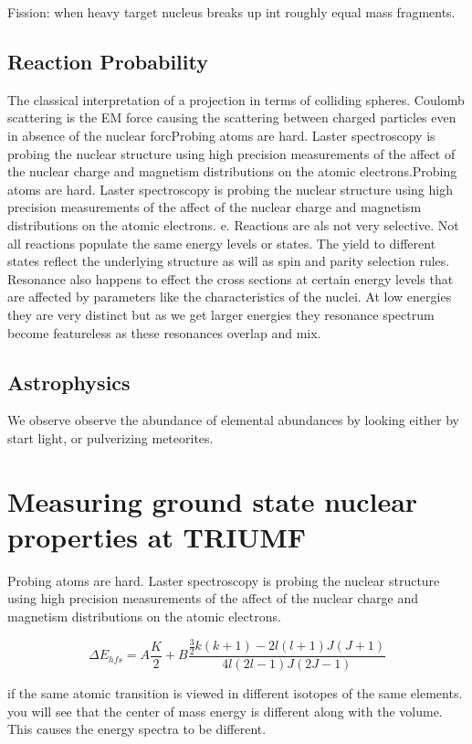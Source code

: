 \documentclass[english, 11pt]{article}
\begin{document}
Fission: when heavy target nucleus breaks up int roughly equal mass fragments.

\subsection{Reaction Probability} %
\label{sub:reaction_rop}

The classical interpretation of a projection in terms of colliding spheres. Coulomb scattering is the EM force causing the scattering between charged particles even in absence of the nuclear forcProbing atoms are hard. Laster spectroscopy is probing the nuclear structure using high precision measurements of the affect of the nuclear charge and magnetism distributions on the atomic electrons.Probing atoms are hard. Laster spectroscopy is probing the nuclear structure using high precision measurements of the affect of the nuclear charge and magnetism distributions on the atomic electrons.  e. Reactions are als not very selective. Not all reactions populate the same energy levels or states. The yield to different states reflect the underlying structure as will as spin and parity selection rules. Resonance also happens to effect the cross sections at certain energy levels that are affected by parameters like the characteristics of the nuclei. At low energies they are very distinct but as we get larger energies they resonance spectrum become featureless as these resonances overlap and mix.

\subsection{Astrophysics} %
\label{sub:astrophysics}

We observe observe the abundance of elemental abundances by looking either by start light, or pulverizing meteorites.

\section{Measuring ground state nuclear properties at TRIUMF}

Probing atoms are hard. Laster spectroscopy is probing the nuclear structure using high precision measurements of the affect of the nuclear charge and magnetism distributions on the atomic electrons.

\[ \Delta E_{hfs} = A\frac{K}{2} + B\frac{\frac{3}{2}k(k+1) - 2l(l+1)J(J+1)}{4l(2l-1)J(2J-1)}  \]

if the same atomic transition is viewed in different isotopes of the same elements. you will see that the center of mass energy is different along with the volume. This causes the energy spectra to be different.
\end{document}
